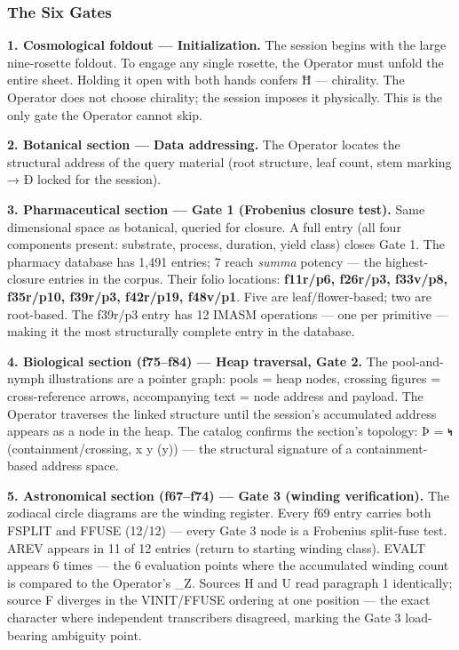 \hypertarget{the-six-gates}{%
\subsubsection{The Six Gates}\label{the-six-gates}}

\textbf{1. Cosmological foldout --- Initialization.} The session begins
with the large nine-rosette foldout. To engage any single rosette, the
Operator must unfold the entire sheet. Holding it open with both hands
confers Ħ --- chirality. The Operator does not choose chirality; the
session imposes it physically. This is the only gate the Operator cannot
skip.

\textbf{2. Botanical section --- Data addressing.} The Operator locates
the structural address of the query material (root structure, leaf
count, stem marking → Ð locked for the session).

\textbf{3. Pharmaceutical section --- Gate 1 (Frobenius closure test).}
Same dimensional space as botanical, queried for closure. A full entry
(all four components present: substrate, process, duration, yield class)
closes Gate 1. The pharmacy database has 1,491 entries; 7 reach
\emph{summa} potency --- the highest-closure entries in the corpus.
Their folio locations: \textbf{f11r/p6, f26r/p3, f33v/p8, f35r/p10,
f39r/p3, f42r/p19, f48v/p1}. Five are leaf/flower-based; two are
root-based. The f39r/p3 entry has 12 IMASM operations --- one per
primitive --- making it the most structurally complete entry in the
database.

\textbf{4. Biological section (f75--f84) --- Heap traversal, Gate 2.}
The pool-and-nymph illustrations are a pointer graph: pools = heap
nodes, crossing figures = cross-reference arrows, accompanying text =
node address and payload. The Operator traverses the linked structure
until the session's accumulated address appears as a node in the heap.
The catalog confirms the section's topology: Þ = 𐑰
(containment/crossing, x \subseteq y \land {}(y)) --- the
structural signature of a containment-based address space.

\textbf{5. Astronomical section (f67--f74) --- Gate 3 (winding
verification).} The zodiacal circle diagrams are the winding register.
Every f69 entry carries both FSPLIT and FFUSE (12/12) --- every Gate 3
node is a Frobenius split-fuse test. AREV appears in 11 of 12 entries
(return to starting winding class). EVALT appears 6 times --- the 6
evaluation points where the accumulated winding count is compared to the
Operator's \Omega\_Z. Sources H and U read paragraph 1 identically;
source F diverges in the VINIT/FFUSE ordering at one position --- the
exact character where independent transcribers disagreed, marking the
Gate 3 load-bearing ambiguity point.

